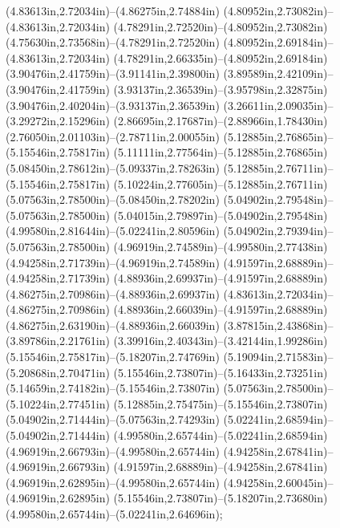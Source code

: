 (4.83613in,2.72034in)--(4.86275in,2.74884in) (4.80952in,2.73082in)--(4.83613in,2.72034in) (4.78291in,2.72520in)--(4.80952in,2.73082in) (4.75630in,2.73568in)--(4.78291in,2.72520in) (4.80952in,2.69184in)--(4.83613in,2.72034in) (4.78291in,2.66335in)--(4.80952in,2.69184in) (3.90476in,2.41759in)--(3.91141in,2.39800in) (3.89589in,2.42109in)--(3.90476in,2.41759in) (3.93137in,2.36539in)--(3.95798in,2.32875in) (3.90476in,2.40204in)--(3.93137in,2.36539in) (3.26611in,2.09035in)--(3.29272in,2.15296in) (2.86695in,2.17687in)--(2.88966in,1.78430in) (2.76050in,2.01103in)--(2.78711in,2.00055in) (5.12885in,2.76865in)--(5.15546in,2.75817in) (5.11111in,2.77564in)--(5.12885in,2.76865in) (5.08450in,2.78612in)--(5.09337in,2.78263in) (5.12885in,2.76711in)--(5.15546in,2.75817in) (5.10224in,2.77605in)--(5.12885in,2.76711in) (5.07563in,2.78500in)--(5.08450in,2.78202in) (5.04902in,2.79548in)--(5.07563in,2.78500in) (5.04015in,2.79897in)--(5.04902in,2.79548in) (4.99580in,2.81644in)--(5.02241in,2.80596in) (5.04902in,2.79394in)--(5.07563in,2.78500in) (4.96919in,2.74589in)--(4.99580in,2.77438in) (4.94258in,2.71739in)--(4.96919in,2.74589in) (4.91597in,2.68889in)--(4.94258in,2.71739in) (4.88936in,2.69937in)--(4.91597in,2.68889in) (4.86275in,2.70986in)--(4.88936in,2.69937in) (4.83613in,2.72034in)--(4.86275in,2.70986in) (4.88936in,2.66039in)--(4.91597in,2.68889in) (4.86275in,2.63190in)--(4.88936in,2.66039in) (3.87815in,2.43868in)--(3.89786in,2.21761in) (3.39916in,2.40343in)--(3.42144in,1.99286in) (5.15546in,2.75817in)--(5.18207in,2.74769in) (5.19094in,2.71583in)--(5.20868in,2.70471in) (5.15546in,2.73807in)--(5.16433in,2.73251in) (5.14659in,2.74182in)--(5.15546in,2.73807in) (5.07563in,2.78500in)--(5.10224in,2.77451in) (5.12885in,2.75475in)--(5.15546in,2.73807in) (5.04902in,2.71444in)--(5.07563in,2.74293in) (5.02241in,2.68594in)--(5.04902in,2.71444in) (4.99580in,2.65744in)--(5.02241in,2.68594in) (4.96919in,2.66793in)--(4.99580in,2.65744in) (4.94258in,2.67841in)--(4.96919in,2.66793in) (4.91597in,2.68889in)--(4.94258in,2.67841in) (4.96919in,2.62895in)--(4.99580in,2.65744in) (4.94258in,2.60045in)--(4.96919in,2.62895in) (5.15546in,2.73807in)--(5.18207in,2.73680in) (4.99580in,2.65744in)--(5.02241in,2.64696in);
